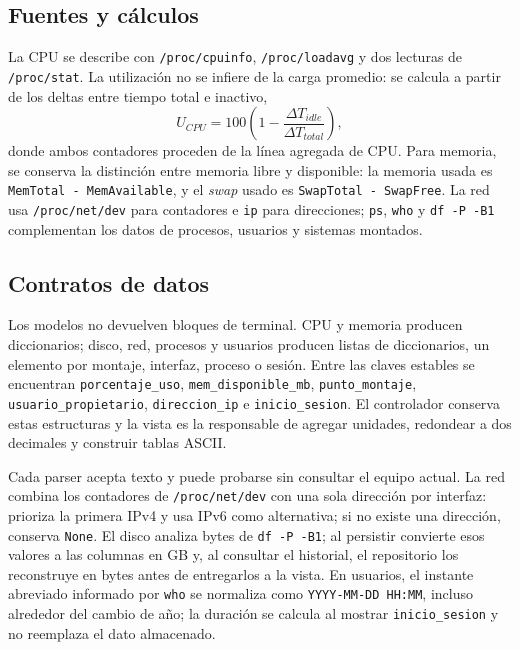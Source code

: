 \documentclass[conference]{IEEEtran}
\begin{document}
\subsection{Fuentes y c\'alculos}
La CPU se describe con \texttt{/proc/cpuinfo}, \texttt{/proc/loadavg} y dos lecturas de \texttt{/proc/stat}. La utilizaci\'on no se infiere de la carga promedio: se calcula a partir de los deltas entre tiempo total e inactivo,
\begin{equation}
U_{CPU}=100\left(1-\frac{\Delta T_{idle}}{\Delta T_{total}}\right),
\end{equation}
donde ambos contadores proceden de la l\'inea agregada de CPU. Para memoria, se conserva la distinci\'on entre memoria libre y disponible: la memoria usada es \texttt{MemTotal - MemAvailable}, y el \textit{swap} usado es \texttt{SwapTotal - SwapFree}. La red usa \texttt{/proc/net/dev} para contadores e \texttt{ip} para direcciones; \texttt{ps}, \texttt{who} y \texttt{df -P -B1} complementan los datos de procesos, usuarios y sistemas montados.

\subsection{Contratos de datos}
Los modelos no devuelven bloques de terminal. CPU y memoria producen diccionarios; disco, red, procesos y usuarios producen listas de diccionarios, un elemento por montaje, interfaz, proceso o sesi\'on. Entre las claves estables se encuentran \texttt{porcentaje\_uso}, \texttt{mem\_disponible\_mb}, \texttt{punto\_montaje}, \texttt{usuario\_propietario}, \texttt{direccion\_ip} e \texttt{inicio\_sesion}. El controlador conserva estas estructuras y la vista es la responsable de agregar unidades, redondear a dos decimales y construir tablas ASCII.

Cada parser acepta texto y puede probarse sin consultar el equipo actual. La red combina los contadores de \texttt{/proc/net/dev} con una sola direcci\'on por interfaz: prioriza la primera IPv4 y usa IPv6 como alternativa; si no existe una direcci\'on, conserva \texttt{None}. El disco analiza bytes de \texttt{df -P -B1}; al persistir convierte esos valores a las columnas en GB y, al consultar el historial, el repositorio los reconstruye en bytes antes de entregarlos a la vista. En usuarios, el instante abreviado informado por \texttt{who} se normaliza como \texttt{YYYY-MM-DD HH:MM}, incluso alrededor del cambio de a\~no; la duraci\'on se calcula al mostrar \texttt{inicio\_sesion} y no reemplaza el dato almacenado.
\end{document}
